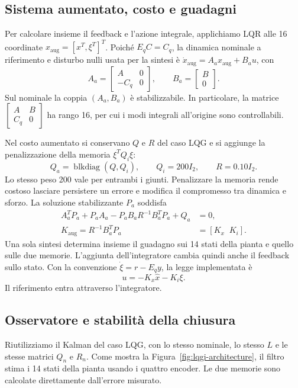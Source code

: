 \subsection{Sistema aumentato, costo e guadagni}

Per calcolare insieme il feedback e l'azione integrale, applichiamo
LQR alle 16 coordinate $x_{\mathrm{aug}}=[x^T,\xi^T]^T$.
Poiché $E_qC=C_q$, la dinamica nominale a riferimento e disturbo nulli
usata per la sintesi è $\dot x_{\mathrm{aug}}=A_ax_{\mathrm{aug}}+B_au$,
con
\[
A_a=\begin{bmatrix}A&0\\-C_q&0\end{bmatrix},
\qquad B_a=\begin{bmatrix}B\\0\end{bmatrix}.
\]
Sul nominale la coppia $(A_a,B_a)$ è stabilizzabile. In particolare,
la matrice $\left[\begin{smallmatrix}A&B\\C_q&0\end{smallmatrix}\right]$
ha rango 16, per cui i modi integrali all'origine sono controllabili.

Nel costo aumentato si conservano $Q$ e $R$ del caso LQG e si aggiunge
la penalizzazione della memoria $\xi^TQ_i\xi$:
\[
Q_a=\operatorname{blkdiag}(Q,Q_i),\qquad Q_i=200I_2,\qquad R=0.10 I_2.
\]
Lo stesso peso 200 vale per entrambi i giunti. Penalizzare la memoria
rende costoso lasciare persistere un errore e modifica il compromesso
tra dinamica e sforzo. La soluzione stabilizzante $P_a$ soddisfa
\[
\begin{aligned}
A_a^TP_a+P_aA_a-P_aB_aR^{-1}B_a^TP_a+Q_a&=0,\\
K_{\mathrm{aug}}=R^{-1}B_a^TP_a&=[K_x\;\;K_i].
\end{aligned}
\]
Una sola sintesi determina insieme il guadagno sui 14 stati della
pianta e quello sulle due memorie. L'aggiunta dell'integratore cambia
quindi anche il feedback sullo stato. Con la convenzione
$\dot\xi=r-E_qy$, la legge implementata è
\[
u=-K_x\hat x-K_i\xi.
\]
Il riferimento entra attraverso l'integratore.

\subsection{Osservatore e stabilità della chiusura}

Riutilizziamo il Kalman del caso LQG, con lo stesso nominale, lo stesso
$L$ e le stesse matrici $Q_n$ e $R_n$. Come mostra la
Figura~\ref{fig:lqgi-architecture}, il filtro stima i 14 stati della
pianta usando i quattro encoder. Le due memorie sono calcolate
direttamente dall'errore misurato.


